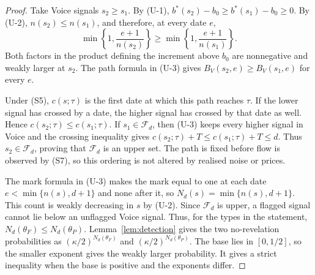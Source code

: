 \begin{proof}
Take Voice signals $s_2\ge s_1$. By (U-1),
$b^*(s_2)-b_0\ge b^*(s_1)-b_0\ge0$. By (U-2),
$n(s_2)\le n(s_1)$, and therefore, at every date $e$,
\[
  \min\!\left\{1,\frac{e+1}{n(s_2)}\right\}
  \ge
  \min\!\left\{1,\frac{e+1}{n(s_1)}\right\}.
\]
Both factors in the product defining the increment above $b_0$ are nonnegative and weakly
larger at $s_2$. The path formula in (U-3) gives
$B_V(s_2,e)\ge B_V(s_1,e)$ for every $e$.

Under (S5), $c(s;\tau)$ is the first date at which this path reaches $\tau$. If the lower signal
has crossed by a date, the higher signal has crossed by that date as well. Hence
$c(s_2;\tau)\le c(s_1;\tau)$. If $s_1\in\mathcal F_d$, then (U-3) keeps every higher signal in
Voice and the crossing inequality gives
$c(s_2;\tau)+T\le c(s_1;\tau)+T\le d$. Thus $s_2\in\mathcal F_d$, proving that
$\mathcal F_d$ is an upper set. The path is fixed before flow is observed by (S7), so this
ordering is not altered by realised noise or prices.

The mark formula in (U-3) makes the mark equal to one at each date
$e<\min\{n(s),d+1\}$ and none after it, so
$N_d(s)=\min\{n(s),d+1\}$. This count is weakly decreasing in $s$ by (U-2). Since
$\mathcal F_d$ is upper, a flagged signal cannot lie below an unflagged Voice signal. Thus, for the
types in the statement, $N_d(\theta_F)\le N_d(\theta_P)$. Lemma~\ref{lem:detection} gives the two
no-revelation probabilities as $(\kappa/2)^{N_d(\theta_F)}$ and
$(\kappa/2)^{N_d(\theta_P)}$. The base lies in $[0,1/2]$, so the smaller
exponent gives the weakly larger probability. It gives a strict inequality when the base is
positive and the exponents differ.
\end{proof}

